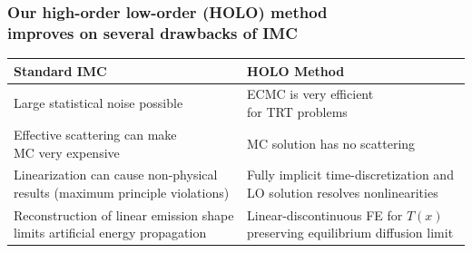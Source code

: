 \documentclass[xcolor=dvipsnames,hyperref={pdfpagelabels=false},unknownkeysallowed,
handout]{beamer}
\newcommand{\colb}[1]{{\color{blue} #1}}
\newcommand{\colG}[1]{{\color{Gray!110} #1}}
\newcommand{\colr}[1]{{\color{red} #1}}
\newlength{\tabsep}
\begin{document}
\begin{frame}
\frametitle{Our \colb{high-order low-order (HOLO) method} \\improves on several drawbacks of IMC}
    \begin{center}
{\footnotesize
\begin{tabular}{p{} p{}} 
    \multicolumn{1}{l}{\textbf{\normalsize Standard  IMC}} & \multicolumn{1}{l}{\textbf{\normalsize
    HOLO Method}} \\ \hline [2pt]
    \parbox{0.4\textwidth}{Large \colr{statistical noise} possible} & 
    \parbox{0.4\textwidth}{ECMC is \colb{very efficient} \\for TRT problems} \\ [\tabsep]
 \parbox{0.4\textwidth}{{\color{red}Effective scattering} can make \\ MC  very expensive}
 & \parbox{0.4\textwidth}{MC solution has \colb{no
 scattering}} \\[\tabsep] 
 \parbox{0.5\textwidth}{Linearization can cause \colr{non-physical}\\ results  (maximum principle
 violations)} & \parbox{0.5\textwidth}{Fully \colb{implicit} time-discretization
 and \\ LO solution \colb{resolves nonlinearities}} \\[\tabsep] 
 \parbox{0.5\textwidth}{\colG{Reconstruction of linear emission shape limits artificial energy propagation}} &
 \parbox{0.5\textwidth}{Linear-discontinuous FE for $T(x)$ \\ preserving equilibrium diffusion limit} 
\end{tabular}
}
\end{center}
\end{frame}
\end{document}
